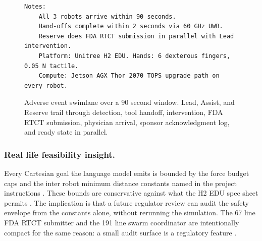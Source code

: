 \begin{sectionaccent}
\begin{figure}[H]
\begin{Verbatim}[fontsize=\footnotesize]
  Notes:
    All 3 robots arrive within 90 seconds.
    Hand-offs complete within 2 seconds via 60 GHz UWB.
    Reserve does FDA RTCT submission in parallel with Lead intervention.
    Platform: Unitree H2 EDU. Hands: 6 dexterous fingers, 0.05 N tactile.
    Compute: Jetson AGX Thor 2070 TOPS upgrade path on every robot.
\end{Verbatim}
\caption{Adverse event swimlane over a 90 second window. Lead, Assist, and Reserve trail through detection, tool handoff, intervention, FDA RTCT submission, physician arrival, sponsor acknowledgment log, and ready state in parallel.}
\label{fig:ae-response-flow}
\end{figure}

\subsubsection*{Real life feasibility insight.} Every Cartesian goal
the language model emits is bounded by the force budget caps and the
inter robot minimum distance constants named in the project
instructions \cite{kawchak_2026_humanoid_instructions}. These bounds
are conservative against what the H2 EDU spec sheet permits
\cite{unitree_h2_2026}. The implication is that a future regulator
review can audit the safety envelope from the constants alone,
without rerunning the simulation. The 67 line FDA RTCT submitter and
the 191 line swarm coordinator are intentionally compact for the
same reason: a small audit surface is a regulatory feature
\cite{iec_62304}.



\end{sectionaccent}
